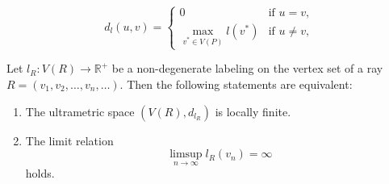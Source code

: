 \documentclass[10pt,a4paper]{amsart}
\begin{document}
\begin{equation}\label{e11.3}
d_l(u, v) = \begin{cases}
0 & \text{if } u = v,\\
\max\limits_{v^{*} \in V(P)} l(v^{*}) & \text{if } u \neq v,
\end{cases}
\end{equation}

\begin{proposition}\label{52dcij}
Let $l_R\colon V(R) \to \mathbb{R}^+$ be a non-degenerate labeling on the vertex set of a ray $R = (v_1, v_2, \ldots, v_n, \ldots)$. Then the following statements are equivalent:

\begin{enumerate}[label=\textit{(\roman*)}, left=0pt]
\item The ultrametric space $(V(R), d_{l_R})$ is locally finite.

\item The limit relation
\begin{equation}\label{tghuaa}
\limsup_{n \to \infty} l_R(v_n) = \infty 
\end{equation}
holds.
\end{enumerate}
\end{proposition}
\end{document}
